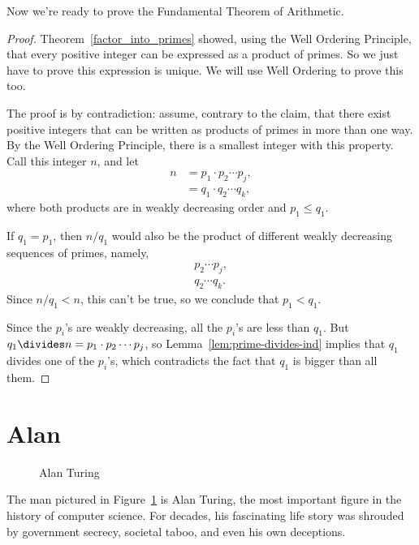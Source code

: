Now we're ready to prove the Fundamental Theorem of Arithmetic.
\begin{proof}
Theorem~\ref{factor_into_primes} showed, using the Well Ordering
Principle, that every positive integer can be expressed as a product
of primes.  So we just have to prove this expression is unique.  We
will use Well Ordering to prove this too.

The proof is by contradiction: assume, contrary to the claim, that
there exist positive integers that can be written as products of
primes in more than one way.  By the Well Ordering Principle, there is
a smallest integer with this property.  Call this integer $n$, and let
\begin{align*}
n & = p_1 \cdot p_2 \cdots p_j, \\
& = q_1 \cdot q_2 \cdots q_k,
\end{align*}
where both products are in weakly decreasing order and $p_1 \le q_1$.

If $q_1 = p_1$, then $n/q_1$ would also be the product of different
weakly decreasing sequences of primes, namely,
\begin{align*}
 p_2 \cdots p_j, \\
q_2 \cdots q_k.
\end{align*}
Since $n/q_1 < n$, this can't be true, so we conclude that $p_1 <
q_1$.

Since the $p_i$'s are weakly decreasing, all the $p_i$'s are less than
$q_1$.  But $q_1 \divides n= p_1 \cdot p_2 \cdots p_j$, so
Lemma~\ref{lem:prime-divides-ind} implies that $q_1$ divides one of
the $p_i$'s, which contradicts the fact that $q_1$ is bigger than all
them.
\end{proof}

\begin{problems}
\classproblems {}

\homeworkproblems {}

\end{problems}

\section{Alan }\label{Turing_sec}

\begin{figure}\redrawntrue
{}
\caption{Alan Turing}
\label{fig:Turing}
\end{figure}

The man pictured in Figure~\ref{fig:Turing} is Alan Turing, the most
important figure in the history of computer science.  For decades, his
fascinating life story was shrouded by government secrecy, societal
taboo, and even his own deceptions.

